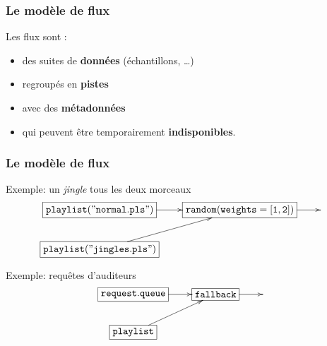 \documentclass{beamer}
\begin{document}
\begin{frame}
  \frametitle{Le modèle de flux}

  Les flux sont :
  \begin{itemize}
  \item des suites de \textbf{données} (échantillons, \ldots)
  \item regroupés en \textbf{pistes}
  \item avec des \textbf{métadonnées}
  \item qui peuvent être temporairement \textbf{indisponibles}.
  \end{itemize}
\end{frame}

\begin{frame}
  \frametitle{Le modèle de flux}

  \begin{block}{Exemple: un \emph{jingle} tous les deux morceaux}
    \[
    \xymatrix{
      *+[F]{\mathtt{playlist("normal.pls")}}\ar[r] &
      *+[F]{\mathtt{random(weights=[1,2])}} \ar[r] & \\
      *+[F]{\mathtt{playlist("jingles.pls")}}\ar[ur] & & \\
    }
    \]
  \end{block}

  \begin{block}{Exemple: requêtes d'auditeurs}
    \[
    \xymatrix{
      *+[F]{\mathtt{request.queue}}\ar[r] &
      *+[F]{\mathtt{fallback}} \ar[r] & \\
      *+[F]{\mathtt{playlist}}\ar[ur] & & \\
    }
    \]
  \end{block}
\end{frame}
\end{document}
